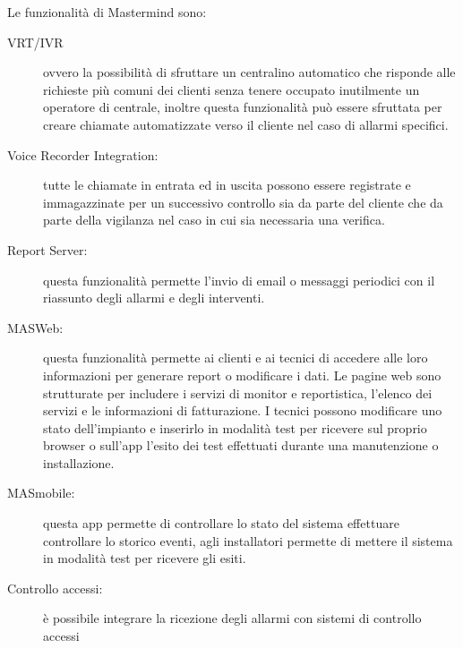 Le funzionalità di Mastermind sono:
\begin{description}
	\item[VRT/IVR] ovvero la possibilità di sfruttare un centralino automatico che risponde alle richieste più comuni dei clienti senza tenere occupato inutilmente un operatore di centrale, inoltre questa funzionalità può essere sfruttata per creare chiamate automatizzate verso il cliente nel caso di allarmi specifici.
	\item[Voice Recorder Integration:] tutte le chiamate in entrata ed in uscita possono essere registrate e immagazzinate per un successivo controllo sia da parte del cliente che da parte della vigilanza nel caso in cui sia necessaria una verifica.
	\item[Report Server:] questa funzionalità permette l'invio di email o messaggi periodici con il riassunto degli allarmi e degli interventi.
	\item[MASWeb:] questa funzionalità permette ai clienti e ai tecnici di accedere alle loro informazioni per generare report o modificare i dati. Le pagine web sono strutturate per includere i servizi di monitor e reportistica, l'elenco dei servizi e le informazioni di fatturazione. I tecnici possono modificare uno stato dell'impianto e inserirlo in modalità test per ricevere sul proprio browser o sull'app l'esito dei test effettuati durante una manutenzione o installazione.
	\item[MASmobile:] questa app permette di controllare lo stato del sistema effettuare controllare lo storico eventi, agli installatori permette di mettere il sistema in modalità test per ricevere gli esiti.
	\item[Controllo accessi:] è possibile integrare la ricezione degli allarmi con sistemi di controllo accessi 
\end{description}
